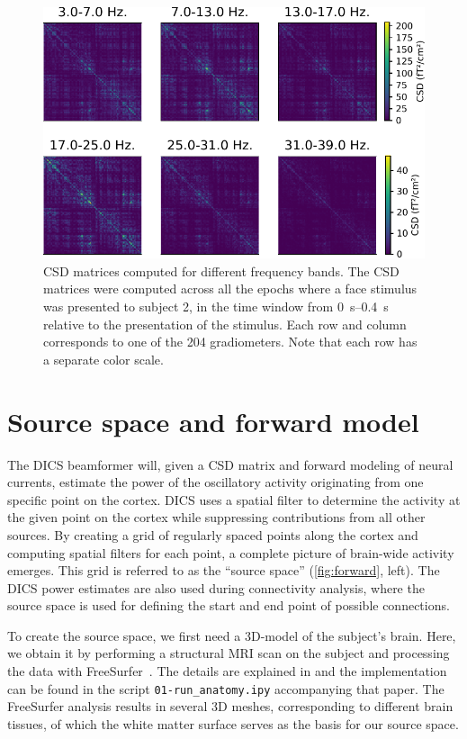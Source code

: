 \documentclass[utf8]{frontiersSCNS}
\renewcommand{\cite}[1]{~\citep{#1}}
\newcommand{\textcite}[1]{\citet{#1}}
\newcommand{\code}[1]{\lstinline{#1}}
\begin{document}
\begin{figure}[b]
\centering
\includegraphics[width=12cm]{figures/csd.pdf}
    \caption{CSD matrices computed for different frequency bands. The CSD matrices were computed across all the epochs where a face stimulus was presented to subject 2, in the time window from \SIrange{0}{0.4}{\second} relative to the presentation of the stimulus. Each row and column corresponds to one of the 204 gradiometers. Note that each row has a separate color scale.}%
\label{fig:csd}
\end{figure}


\section{Source space and forward model}\label{forward}

The DICS beamformer will, given a CSD matrix and forward modeling of neural currents, estimate the power of the oscillatory activity originating from one specific point on the cortex.
DICS uses a spatial filter to determine the activity at the given point on the cortex while suppressing contributions from all other sources.
By creating a grid of regularly spaced points along the cortex and computing spatial filters for each point, a complete picture of brain-wide activity emerges.
This grid is referred to as the ``source space'' (\autoref{fig:forward}, left).
The DICS power estimates are also used during connectivity analysis, where the source space is used for defining the start and end point of possible connections.

To create the source space, we first need a 3D-model of the subject's brain.
Here, we obtain it by performing a structural MRI scan on the subject and processing the data with FreeSurfer\cite{freesurfer}.
The details are explained in \textcite{Jas2017} and the implementation can be found in the script \code{01-run_anatomy.ipy} accompanying that paper.
The FreeSurfer analysis results in several 3D meshes, corresponding to different brain tissues, of which the white matter surface serves as the basis for our source space.
\end{document}
